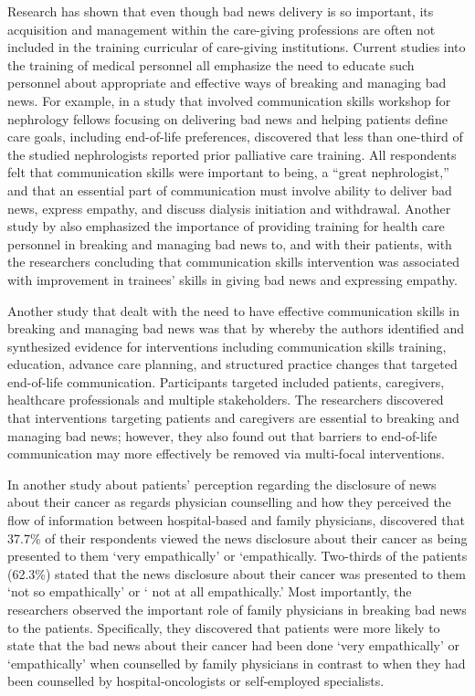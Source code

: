 \documentclass[output=paper,colorlinks,citecolor=brown]{langscibook}
\begin{document}
Research has shown that even though bad news delivery is so important, its acquisition and management within the care-giving professions are often not included in the training curricular of care-giving institutions. Current studies into the training of medical personnel all emphasize the need to educate such personnel about appropriate and effective ways of breaking and managing bad news. For example, in a study that involved communication skills workshop for nephrology fellows focusing on delivering bad news and helping patients define care goals, including end-of-life preferences, \citet{SchellEtAl2013} discovered that less than one-third of the studied nephrologists reported prior palliative care training. All respondents felt that communication skills were important to being, a “great nephrologist,” and that an essential part of communication must involve ability to deliver bad news, express empathy, and discuss dialysis initiation and withdrawal. Another study by \citet{BaysEtAl2014} also emphasized the importance of providing training for health care personnel in breaking and managing bad news to, and with their patients, with the researchers concluding that communication skills intervention was associated with improvement in trainees' skills in giving bad news and expressing empathy. 

Another study that dealt with the need to have effective communication skills in breaking and managing bad news was that by \citet{WalczakEtAl2016} whereby the authors identified and synthesized evidence for interventions including communication skills training, education, advance care planning, and structured practice changes that targeted end-of-life communication. Participants targeted included patients, caregivers, healthcare professionals and multiple stakeholders. The researchers discovered that interventions targeting patients and caregivers are essential to breaking and managing bad news; however, they also found out that barriers to end-of-life communication may more effectively be removed via multi-focal interventions.

In another study about patients’ perception regarding the disclosure of news about their cancer as regards physician counselling and how they perceived the flow of information between hospital‐based and family physicians, \citet{SpiegelEtAl2009} discovered that 37.7\% of their respondents viewed the news disclosure about their cancer as being presented to them ‘very empathically’ or ‘empathically. Two-thirds of the patients (62.3\%) stated that the news disclosure about their cancer was presented to them ‘not so empathically’ or ‘ not at all empathically.’ Most importantly, the researchers observed the important role of family physicians in breaking bad news to the patients. Specifically, they discovered that patients were more likely to state that the bad news about their cancer had been done ‘very empathically’ or ‘empathically’ when counselled by family physicians in contrast to when they had been counselled by hospital‐oncologists or self‐employed specialists. 
\end{document}
